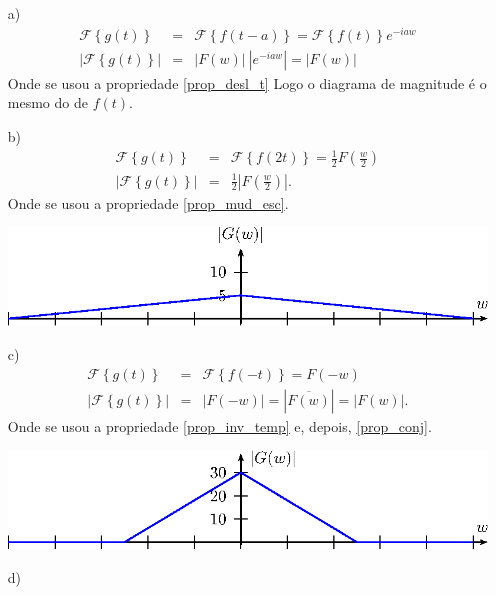 \begin{resp}
\begin{itemize}
\item[a)]
 \begin{eqnarray*}
\mathcal{F}\left\{g(t)\right\}&=&\mathcal{F}\left\{f(t-a)\right\}=\mathcal{F}\left\{f(t)\right\}e^{-iaw}\\
\left|\mathcal{F}\left\{g(t)\right\}\right|&=&|F(w)|~|e^{-iaw}|=|F(w)|
\end{eqnarray*}
Onde se usou a propriedade \ref{prop_desl_t}
Logo o diagrama de magnitude é o mesmo do de $f(t)$.
\item[b)] 
 \begin{eqnarray*}
\mathcal{F}\left\{g(t)\right\}&=&\mathcal{F}\left\{f(2t)\right\}=\frac{1}{2}F\left(\frac{w}{2}\right)\\
\left|\mathcal{F}\left\{g(t)\right\}\right|&=&\frac{1}{2}\left|F\left(\frac{w}{2}\right)\right|.
\end{eqnarray*}
Onde se usou a propriedade \ref{prop_mud_esc}.
\begin{center}
\includegraphics{cap_propriedades_transformada/pics/figura_14}\end{center}
\item[c)] 
 \begin{eqnarray*}
\mathcal{F}\left\{g(t)\right\}&=&\mathcal{F}\left\{f(-t)\right\}=F\left(-w\right)\\
\left|\mathcal{F}\left\{g(t)\right\}\right|&=&\left|F\left(-w\right)\right|=\left|\overline{F\left(w\right)}\right|=\left|F\left(w\right)\right|.
\end{eqnarray*}
Onde se usou a propriedade \ref{prop_inv_temp} e, depois, \ref{prop_conj}.
\begin{center}
\includegraphics{cap_propriedades_transformada/pics/figura_15}\end{center}
\item[d)] 
 \begin{eqnarray*}

\end{eqnarray*}
\end{itemize}
\end{resp}
